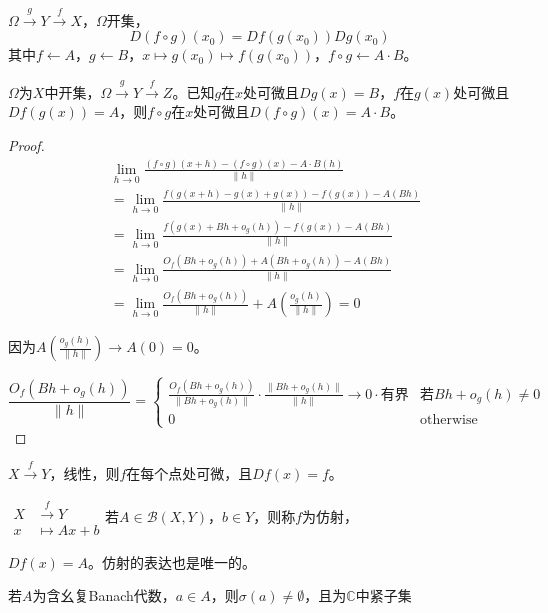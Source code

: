 \documentclass[lang=cn,a4paper,newtx,section]{elegantbook}
\begin{document}
\begin{remark}
  $\Omega \xrightarrow{g} Y \xrightarrow{f} X$，$\Omega$开集，
  \begin{equation*}
    D(f \circ g)(x_0) = Df(g(x_0))Dg(x_0)
  \end{equation*}
  其中$f \leftarrow A$，$g \leftarrow B$，$x \longmapsto g(x_0) \longmapsto f(g(x_0))$，$f \circ g \leftarrow A \cdot B$。
\end{remark}

\begin{proposition}[链式法则]
  $\Omega$为$X$中开集，$\Omega \xrightarrow{g} Y \xrightarrow{f} Z$。已知$g$在$x$处可微且$Dg(x) = B$，$f$在$g(x)$处可微且$Df(g(x)) = A$，则$f \circ g$在$x$处可微且$D(f \circ g)(x) = A \cdot B$。
\end{proposition}

\begin{proof}
  \begin{align*}
    &\lim_{h \to 0}\frac{(f \circ g)(x+h) - (f \circ g)(x) - A \cdot B(h)}{\|h\|} \\
    &= \lim_{h \to 0}\frac{f(g(x+h) - g(x) + g(x)) - f(g(x)) - A(Bh)}{\|h\|} \\
    &= \lim_{h \to 0}\frac{f(g(x) + Bh + o_g(h)) - f(g(x)) - A(Bh)}{\|h\|} \\
    &= \lim_{h \to 0}\frac{O_f(Bh + o_g(h)) + A(Bh + o_g(h)) - A(Bh)}{\|h\|} \\
    &= \lim_{h \to 0}\frac{O_f(Bh + o_g(h))}{\|h\|} + A\left(\frac{o_g(h)}{\|h\|}\right) = 0
  \end{align*}
  
  因为$A\left(\frac{o_g(h)}{\|h\|}\right) \longrightarrow A(0) = 0$。
  
  \begin{equation*}
    \frac{O_f(Bh + o_g(h))}{\|h\|} = \begin{cases}
      \displaystyle\frac{O_f(Bh + o_g(h))}{\|Bh + o_g(h)\|} \cdot \frac{\|Bh + o_g(h)\|}{\|h\|} \longrightarrow 0 \cdot \text{有界} & \text{若}Bh + o_g(h) \neq 0 \\
      0 & \text{otherwise}
    \end{cases}
  \end{equation*}
\end{proof}

\begin{example}
  $X \xrightarrow{f} Y$，线性，则$f$在每个点处可微，且$Df(x) = f$。
\end{example}

\begin{example}
  $ \begin{aligned}
      X &\xrightarrow{f} Y \\
      x &\longmapsto Ax + b
    \end{aligned}$若$A \in \mathcal{B}(X, Y)$，$b \in Y$，则称$f$为仿射，

  $Df(x) = A$。仿射的表达也是唯一的。
\end{example}
\begin{theorem}
  若$A$为含幺复Banach代数，$a \in A$，则$\sigma(a) \neq \emptyset$，且为$\mathbb{C}$中紧子集
\end{theorem}
\end{document}
